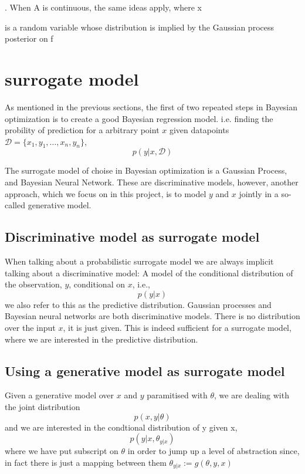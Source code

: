 . When A is continuous, the same ideas apply,
where x

is a random variable whose distribution is implied by the Gaussian process posterior on f



\section{surrogate model}
As mentioned in the previous sections, the first of two repeated steps in Bayesian optimization
is to create a good Bayesian regression model. %
i.e. finding the probility of prediction for a arbitrary point $x$ given datapoints 
$\mathcal{D} = \{x_1, y_1, \dots, x_n, y_n\}$, 
 $$p(y|x,\mathcal{D})$$

The surrogate model of choise in Bayesian optimization is a Gaussian Process, and Bayesian Neural Network.
These are discriminative models, however, another approach, which we focus on in this project, is
to model $y$ and $x$ jointly in a so-called generative model.



\subsection{Discriminative model as surrogate model}
When talking about a probabilistic surrogate model we are always implicit talking about a
discriminative model: A model of the conditional distribution of the observation, $y$, 
conditional on $x$, i.e., 
$$p(y|x)$$
we also refer to this as the predictive distribution. Gaussian processes and Bayesian neural networks
are both discriminative models. There is no distribution over the input $x$, it is just given. 
This is indeed sufficient for a surrogate model, where we are interested in the predictive distribution. 

\subsection{Using a generative model as surrogate model}

Given a generative model over $x$ and $y$ paramitised with $\theta$, we are dealing with the joint distribution
$$p(x,y|\theta)$$
and we are interested in the condtional distribution of y given x, 
$$p(y|x, \theta_{y|x})$$
where we have put subscript on $\theta$ in order to jump up a level of abstraction since, 
in fact there is just a mapping between them $\theta_{y|x} := g(\theta, y, x)$ 


